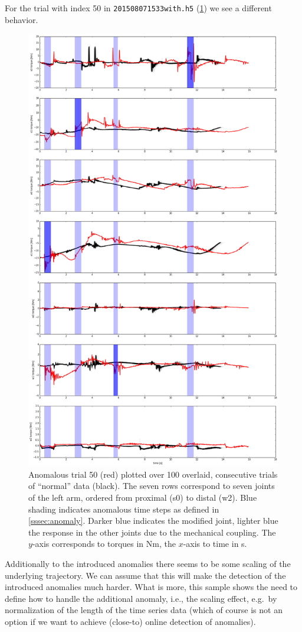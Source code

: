 \documentclass{scrartcl}
\begin{document}
    For the trial with index 50 in \texttt{201508071533with.h5} (\cref{fig:anomaly50}) we see a different behavior.
    \begin{figure}
        \centering
        \includegraphics[width=.7\textwidth]{figs/anomaly50.png}
        \caption{Anomalous trial 50 (red) plotted over 100 overlaid, consecutive trials of ``normal'' data (black).
            The seven rows correspond to seven joints of the left arm, ordered from proximal (s0) to distal (w2).
            Blue shading indicates anomalous time steps as defined in \cref{sssec:anomaly}.
            Darker blue indicates the modified joint, lighter blue the response in the other joints due to the mechanical coupling.
            The $y$-axis corresponds to torques in Nm, the $x$-axis to time in s.}
        \label{fig:anomaly50}
    \end{figure}
    Additionally to the introduced anomalies there seems to be some scaling of the underlying trajectory.
    We can assume that this will make the detection of the introduced anomalies much harder.
    What is more, this sample shows the need to define how to handle the additional anomaly, i.e., the scaling effect, e.g.\ by normalization of the length of the time series data (which of course is not an option if we want to achieve (close-to) online detection of anomalies).
\end{document}
